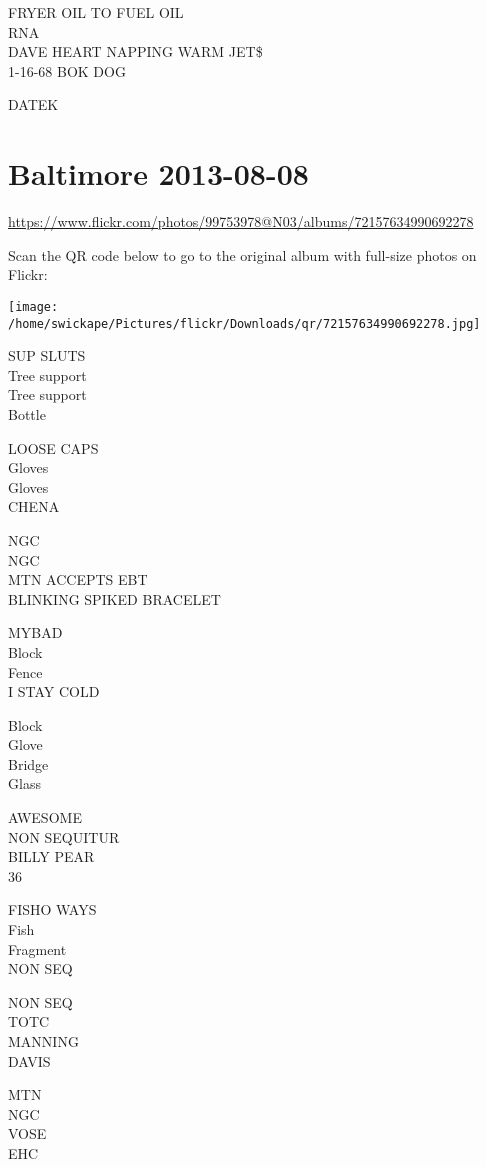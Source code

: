 \documentclass[10pt,letterpaper]{article}
\begin{document}
FRYER OIL TO FUEL OIL\\
RNA\\
DAVE HEART NAPPING WARM JET\$\\
1{-}16{-}68 BOK DOG

DATEK


\section*{Baltimore 2013-08-08}

\url{https://www.flickr.com/photos/99753978@N03/albums/72157634990692278}

Scan the QR code below to go to the original album with full-size photos on Flickr:

\texttt{[image: /home/swickape/Pictures/flickr/Downloads/qr/72157634990692278.jpg]}


SUP SLUTS\\
Tree support\\
Tree support\\
Bottle

LOOSE CAPS\\
Gloves\\
Gloves\\
CHENA

NGC\\
NGC\\
MTN ACCEPTS EBT\\
BLINKING SPIKED BRACELET

MYBAD\\
Block\\
Fence\\
I STAY COLD

Block\\
Glove\\
Bridge\\
Glass

AWESOME\\
NON SEQUITUR\\
BILLY PEAR\\
36

FISHO WAYS\\
Fish\\
Fragment\\
NON SEQ

NON SEQ\\
TOTC\\
MANNING\\
DAVIS

MTN\\
NGC\\
VOSE\\
EHC
\end{document}
